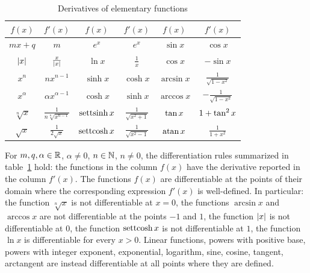 \begin{table}
  \begin{tabular}{c|c||c|c||c|c}
    $f(x)$ & $f'(x)$ & $f(x)$ & $f'(x)$ & $f(x)$ & $f'(x)$
    \\\hline
    $mx + q$ & $m$ &
    $e^x$ & $e^x$ &
    $\sin x$ & $\cos x$ \\
    ${\left|x\right|}$ & $\frac{x}{{\left|x\right|}}$ &
    $\ln x$ & $\frac 1 x$ &
    $\cos x$ & $-\sin x$ \\
    $x^n$ & $n x^{n-1}$ &
    $\sinh x$ & $\cosh x$ &
    $\arcsin x$ & $\frac{1}{\sqrt{1-x^2}}$ \\
    $x^\alpha$ & $\alpha x^{\alpha -1}$ &
    $\cosh x$ & $\sinh x$ & $\arccos x$ & $-\frac{1}{\sqrt{1-x^2}}$ \\
    $\sqrt[n]{x}$ & $\frac{1}{n\sqrt[n]{x^{n-1}}}$ &
    $\operatorname{settsinh} x$ & $\frac{1}{\sqrt{x^2+1}}$ &
    $\operatorname{tan} x$ & $1+ \operatorname{tan}^2 x$ \\
    $\sqrt{x}$ & $\frac{1}{2\sqrt{x}}$ &
    $\operatorname{settcosh} x$ & $\frac{1}{\sqrt{x^2-1}}$ &
    $\operatorname{atan} x$ & $\frac{1}{1+x^2}$
  \end{tabular}
  \caption{Derivatives of elementary functions}
  \label{tab:derivate}%
\end{table}

\begin{theorem}%
\label{th:derivate_elementari}%
%
\mymark{**}%
For $m,q,\alpha \in {\mathbb R}$, $\alpha \neq 0$, $n\in {\mathbb N}$, $n\neq 0$,
the differentiation rules summarized in
table~\ref{tab:derivate} hold: the functions in the column
$f(x)$ have the derivative reported in the column $f'(x)$.
The functions $f(x)$ are differentiable at the points of their domain 
where the corresponding expression $f'(x)$ is well-defined.
In particular:
the function $\sqrt[n]{x}$
is not differentiable at $x=0$,
the functions $\arcsin x$ and $\arccos x$ are not differentiable at the points
$-1$ and $1$,
the function ${\left|x\right|}$ is not differentiable at $0$,
the function $\operatorname{settcosh} x$ is not differentiable at $1$,
the function $\ln x$ is differentiable for every $x>0$.
Linear functions, powers with positive base, powers with integer exponent,
exponential, logarithm, sine, cosine, tangent, arctangent are instead
differentiable
at all points where they are defined.
\end{theorem}

